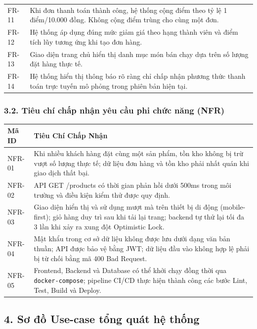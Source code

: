 \documentclass[11pt,a4paper]{article}
\begin{document}
\begin{longtable}[]{@{}
  >{\raggedright\arraybackslash}p{}
  >{\raggedright\arraybackslash}p{}@{}}
FR-11 & Khi đơn thanh toán thành công, hệ thống cộng điểm theo tỷ lệ 1 điểm/10.000 đồng. Không cộng điểm trùng cho cùng một đơn. \\
FR-12 & Hệ thống áp dụng đúng mức giảm giá theo hạng thành viên và điểm tích lũy tương ứng khi tạo đơn hàng. \\
FR-13 & Giao diện trang chủ hiển thị danh mục món bán chạy dựa trên số lượng đặt hàng thực tế. \\
FR-14 & Hệ thống hiển thị thông báo rõ ràng chỉ chấp nhận phương thức thanh toán trực tuyến mô phỏng trong phiên bản hiện tại. \\
\end{longtable}

\subsubsection*{3.2. Tiêu chí chấp nhận yêu cầu phi chức năng (NFR)}

\begin{longtable}[]{@{}
  >{\raggedright\arraybackslash}p{}
  >{\raggedright\arraybackslash}p{}@{}}
\toprule
\textbf{Mã ID} & \textbf{Tiêu Chí Chấp Nhận} \\
\midrule
\endhead
\bottomrule
\endlastfoot
NFR-01 & Khi nhiều khách hàng đặt cùng một sản phẩm, tồn kho không bị trừ vượt số lượng thực tế; dữ liệu đơn hàng và tồn kho phải nhất quán khi giao dịch thất bại. \\
NFR-02 & API GET /products có thời gian phản hồi dưới 500ms trong môi trường và điều kiện kiểm thử được quy định. \\
NFR-03 & Giao diện hiển thị và sử dụng mượt mà trên thiết bị di động (mobile-first); giỏ hàng duy trì sau khi tải lại trang; backend tự thử lại tối đa 3 lần khi xảy ra xung đột Optimistic Lock. \\
NFR-04 & Mật khẩu trong cơ sở dữ liệu không được lưu dưới dạng văn bản thuần; API được bảo vệ bằng JWT; dữ liệu đầu vào không hợp lệ phải bị từ chối bằng mã 400 Bad Request. \\
NFR-05 & Frontend, Backend và Database có thể khởi chạy đồng thời qua \texttt{docker-compose}; pipeline CI/CD thực hiện thành công các bước Lint, Test, Build và Deploy. \\
\end{longtable}

\subsection*{4. Sơ đồ Use-case tổng quát hệ thống}
\label{sec:overall-usecase}
\end{document}
